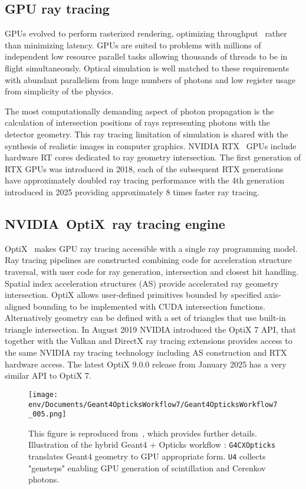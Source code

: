 \documentclass{webofc}
\begin{document}
\subsection{GPU ray tracing}%
%
GPUs evolved to perform rasterized rendering, optimizing throughput~\cite{throughput} rather than minimizing latency.
GPUs are suited to problems with millions of independent low resource parallel tasks allowing thousands of threads 
to be in flight simultaneously.
Optical simulation is well matched to these requirements with abundant parallelism 
from huge numbers of photons and low register usage from simplicity of the physics.

The most computationally demanding aspect of photon propagation
is the calculation of intersection positions of rays representing photons with the detector geometry.
This ray tracing limitation of simulation is shared with the synthesis of realistic images in computer graphics. 
NVIDIA RTX~\cite{rtx} GPUs include hardware RT cores dedicated to ray geometry intersection. 
The first generation of RTX GPUs was introduced in 2018, each of the subsequent RTX generations have 
approximately doubled ray tracing performance with the 4th generation introduced in 2025 providing approximately 8 times faster ray tracing. 
%
%
\subsection{NVIDIA\textregistered\ OptiX\texttrademark\ ray tracing engine}
%
OptiX~\cite{optix} makes GPU ray tracing accessible with a single ray programming model.
Ray tracing pipelines are constructed combining code for acceleration structure traversal, 
with user code for ray generation, intersection and closest hit handling.
Spatial index acceleration structures (AS) provide accelerated ray geometry intersection. 
%
OptiX allows user-defined primitives bounded by specified axis-aligned bounding
to be implemented with CUDA intersection functions. Alternatively geometry can be 
defined with a set of triangles that use built-in triangle intersection.  
%
In August 2019 NVIDIA introduced the OptiX 7 API,
that together with the Vulkan and DirectX ray tracing extensions provides access 
to the same NVIDIA ray tracing technology including AS construction and RTX hardware access. 
The latest OptiX 9.0.0 release from January 2025 has a very similar API to OptiX 7.   
%
%
\begin{figure}[t]
\centering
\texttt{[image: env/Documents/Geant4OpticksWorkflow7/Geant4OpticksWorkflow7\_005.png]}
\caption{This figure is reproduced from~\cite{chep2023}, which provides further details. Illustration of the
hybrid Geant4 + Opticks workflow : {\tt G4CXOpticks} translates Geant4 geometry to GPU appropriate form. 
{\tt U4} collects "gensteps" enabling GPU generation of scintillation and Cerenkov photons. 
}
\label{workflow} 
\vspace{-5mm}
\end{figure}
%
\end{document}
